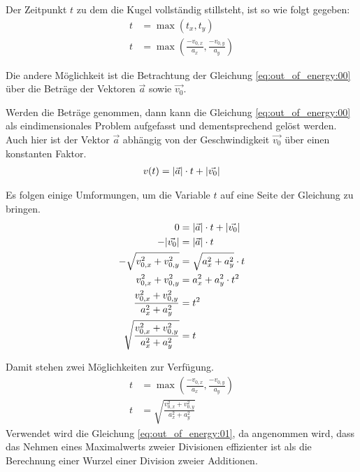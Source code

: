 Der Zeitpunkt $t$ zu dem die Kugel vollständig stillsteht, ist so wie folgt gegeben:
\begin{align}
    t &= \max{(t_x, t_y)}\\
    t &= \max{(\frac{-v_{0,x}}{a_x}, \frac{-v_{0,y}}{a_y})}
\end{align}

Die andere Möglichkeit ist die Betrachtung der Gleichung \ref{eq:out_of_energy:00} über die Beträge der Vektoren
$\vec{a}$ sowie $\vec{v_0}$.

Werden die Beträge genommen, dann kann die Gleichung \ref{eq:out_of_energy:00} als eindimensionales Problem aufgefasst und
dementsprechend gelöst werden. Auch hier ist der Vektor $\vec{a}$ abhängig von der Geschwindigkeit $\vec{v_0}$ über einen
konstanten Faktor.
\begin{align}
    v(t) = \lvert \vec{a} \rvert \cdot t + \lvert \vec{v_0} \rvert
\end{align}

Es folgen einige Umformungen, um die Variable $t$ auf eine Seite der Gleichung zu bringen.
\begin{align}
    0 &= \lvert \vec{a} \rvert \cdot t + \lvert \vec{v_0} \rvert\\
    -\lvert \vec{v_0} \rvert &= \lvert \vec{a} \rvert \cdot t\\
    -\sqrt{v_{0,x}^2 + v_{0,y}^2} &= \sqrt{a_x^2 + a_y^2} \cdot t\\
    v_{0,x}^2 + v_{0,y}^2 &= a_x^2 + a_y^2 \cdot t^2\\
    \frac{v_{0,x}^2 + v_{0,y}^2}{a_x^2 + a_y^2} &= t^2\\
    \sqrt{\frac{v_{0,x}^2 + v_{0,y}^2}{a_x^2 + a_y^2}} &= t
\end{align}

Damit stehen zwei Möglichkeiten zur Verfügung.
\begin{align}
    t &= \max{(\frac{-v_{0,x}}{a_x}, \frac{-v_{0,y}}{a_y})}\label{eq:out_of_energy:01}\\
    t &= \sqrt{\frac{v_{0,x}^2 + v_{0,y}^2}{a_x^2 + a_y^2}}
\end{align}
Verwendet wird die Gleichung \ref{eq:out_of_energy:01}, da angenommen wird, dass das Nehmen eines Maximalwerts zweier
Divisionen effizienter ist als die Berechnung einer Wurzel einer Division zweier Additionen.